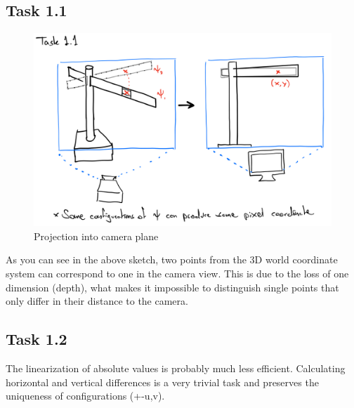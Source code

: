 \documentclass[a4paper]{article} %
\begin{document}
    \subsection*{Task 1.1}
    \begin{figure}[h]
        \centering
        \includegraphics[width= 0.7 \linewidth]{../python/Task1.1_Sketch}
        \caption{Projection into camera plane}
    \end{figure}
    As you can see in the above sketch, two points from the 3D world coordinate system can correspond to one in the camera view.
    This is due to the loss of one dimension (depth), what makes it impossible to distinguish single points that only differ in their distance to the camera.

    \subsection*{Task 1.2}
    The linearization of absolute values is probably much less efficient.
    Calculating horizontal and vertical differences is a very trivial task and preserves the uniqueness of configurations (+-u,v).
\end{document}
